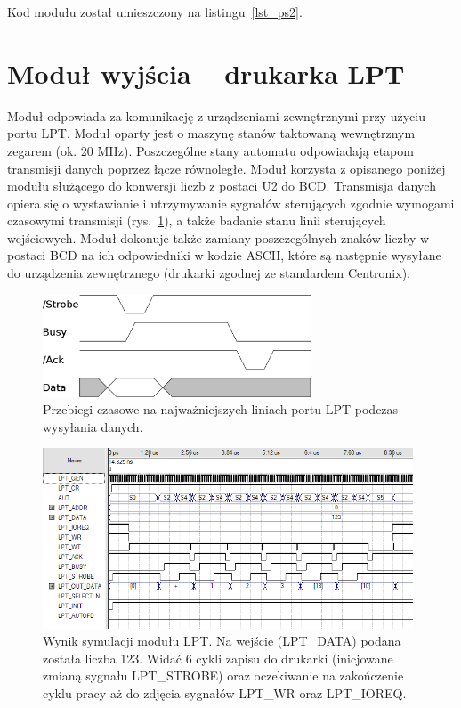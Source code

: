 \documentclass[a4paper,12pt]{report}
\begin{document}
Kod modułu został umieszczony na listingu~\ref{lst_ps2}.

\section{Moduł wyjścia -- drukarka LPT}
Moduł odpowiada za komunikację z urządzeniami zewnętrznymi przy użyciu portu LPT. Moduł oparty jest o maszynę stanów taktowaną wewnętrznym zegarem (ok. 20 MHz). Poszczególne stany automatu odpowiadają etapom transmisji danych poprzez łącze równoległe. Moduł korzysta z opisanego poniżej modułu służącego do konwersji liczb z postaci U2 do BCD. Transmisja danych opiera się o wystawianie i utrzymywanie sygnałów sterujących zgodnie wymogami czasowymi transmisji (rys.~\ref{fig:lpt}), a także badanie stanu linii sterujących wejściowych. Moduł dokonuje także zamiany poszczególnych znaków liczby w postaci BCD na ich odpowiedniki w kodzie ASCII, które są następnie wysyłane do urządzenia zewnętrznego (drukarki zgodnej ze standardem Centronix).

\begin{figure}[h]
\centering
\includegraphics[width=8cm]{./pict/LPT.png}
\caption{Przebiegi czasowe na najważniejszych liniach portu LPT podczas wysyłania danych.}
\label{fig:lpt}
\end{figure}

\begin{figure}[h]
\centering
\includegraphics[width=11cm]{./pict/LPT_sim.png}
\caption{Wynik symulacji modułu LPT. Na wejście (LPT\_DATA) podana została liczba 123. Widać 6 cykli zapisu do drukarki (inicjowane zmianą sygnału LPT\_STROBE) oraz oczekiwanie na zakończenie cyklu pracy aż do zdjęcia sygnałów LPT\_WR oraz LPT\_IOREQ.}
\label{fig:lpt_sim}
\end{figure}
\end{document}
